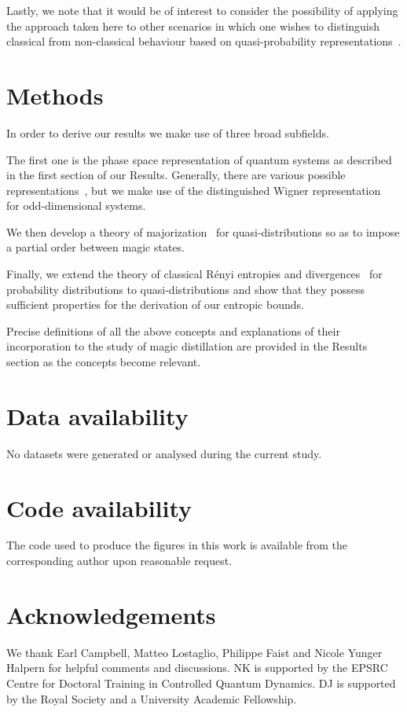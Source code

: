 \documentclass[
onecolumn,
superscriptaddress
]{revtex4-1}
\begin{document}
Lastly, we note that it would be of interest to consider the possibility of applying the approach taken here to other scenarios in which one wishes to distinguish classical from non-classical behaviour based on quasi-probability representations~\cite{Ferrie_2008, barnett_1997,Allahverdyan_2018, arvidsson_2020, halpern_2018, Lostaglio_2018, Levy_2020}.

\section*{Methods}

In order to derive our results we make use of three broad subfields.

The first one is the phase space representation of quantum systems as described in the first section of our Results.
Generally, there are various possible representations~\cite{Ferrie_2008}, but we make use of the distinguished Wigner representation~\cite{Gross2006} for odd-dimensional systems.

We then develop a theory of majorization~\cite{cit:marshall,  Veinott_1971, Ruch_1976} for quasi-distributions so as to impose a partial order between magic states.

Finally, we extend the theory of classical R\'{e}nyi entropies and divergences~\cite{renyi_1960} for probability distributions to quasi-distributions and show that they possess sufficient properties for the derivation of our entropic bounds. 

Precise definitions of all the above concepts and explanations of their incorporation to the study of magic distillation are provided in the Results section as the concepts become relevant.

\section*{Data availability}
No datasets were generated or analysed during the current study.

\section*{Code availability}
The code used to produce the figures in this work is available from the corresponding author upon reasonable request.

\section*{Acknowledgements}
We thank Earl Campbell, Matteo Lostaglio, Philippe Faist and Nicole Yunger Halpern for helpful comments and discussions. NK is supported by the EPSRC Centre for Doctoral Training in Controlled Quantum Dynamics. DJ is supported by the Royal Society and a University Academic Fellowship.
\end{document}
